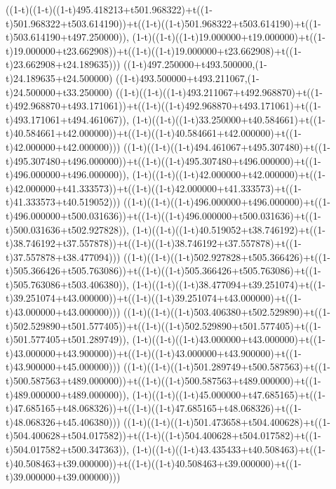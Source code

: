 ((1-t)((1-t)((1-t)495.418213+t501.968322)+t((1-t)501.968322+t503.614190))+t((1-t)((1-t)501.968322+t503.614190)+t((1-t)503.614190+t497.250000)),                                     (1-t)((1-t)((1-t)19.000000+t19.000000)+t((1-t)19.000000+t23.662908))+t((1-t)((1-t)19.000000+t23.662908)+t((1-t)23.662908+t24.189635)))
((1-t)497.250000+t493.500000,(1-t)24.189635+t24.500000)
((1-t)493.500000+t493.211067,(1-t)24.500000+t33.250000)
((1-t)((1-t)((1-t)493.211067+t492.968870)+t((1-t)492.968870+t493.171061))+t((1-t)((1-t)492.968870+t493.171061)+t((1-t)493.171061+t494.461067)),                                     (1-t)((1-t)((1-t)33.250000+t40.584661)+t((1-t)40.584661+t42.000000))+t((1-t)((1-t)40.584661+t42.000000)+t((1-t)42.000000+t42.000000)))
((1-t)((1-t)((1-t)494.461067+t495.307480)+t((1-t)495.307480+t496.000000))+t((1-t)((1-t)495.307480+t496.000000)+t((1-t)496.000000+t496.000000)),                                     (1-t)((1-t)((1-t)42.000000+t42.000000)+t((1-t)42.000000+t41.333573))+t((1-t)((1-t)42.000000+t41.333573)+t((1-t)41.333573+t40.519052)))
((1-t)((1-t)((1-t)496.000000+t496.000000)+t((1-t)496.000000+t500.031636))+t((1-t)((1-t)496.000000+t500.031636)+t((1-t)500.031636+t502.927828)),                                     (1-t)((1-t)((1-t)40.519052+t38.746192)+t((1-t)38.746192+t37.557878))+t((1-t)((1-t)38.746192+t37.557878)+t((1-t)37.557878+t38.477094)))
((1-t)((1-t)((1-t)502.927828+t505.366426)+t((1-t)505.366426+t505.763086))+t((1-t)((1-t)505.366426+t505.763086)+t((1-t)505.763086+t503.406380)),                                     (1-t)((1-t)((1-t)38.477094+t39.251074)+t((1-t)39.251074+t43.000000))+t((1-t)((1-t)39.251074+t43.000000)+t((1-t)43.000000+t43.000000)))
((1-t)((1-t)((1-t)503.406380+t502.529890)+t((1-t)502.529890+t501.577405))+t((1-t)((1-t)502.529890+t501.577405)+t((1-t)501.577405+t501.289749)),                                     (1-t)((1-t)((1-t)43.000000+t43.000000)+t((1-t)43.000000+t43.900000))+t((1-t)((1-t)43.000000+t43.900000)+t((1-t)43.900000+t45.000000)))
((1-t)((1-t)((1-t)501.289749+t500.587563)+t((1-t)500.587563+t489.000000))+t((1-t)((1-t)500.587563+t489.000000)+t((1-t)489.000000+t489.000000)),                                     (1-t)((1-t)((1-t)45.000000+t47.685165)+t((1-t)47.685165+t48.068326))+t((1-t)((1-t)47.685165+t48.068326)+t((1-t)48.068326+t45.406380)))
((1-t)((1-t)((1-t)501.473658+t504.400628)+t((1-t)504.400628+t504.017582))+t((1-t)((1-t)504.400628+t504.017582)+t((1-t)504.017582+t500.347363)),                                     (1-t)((1-t)((1-t)43.435433+t40.508463)+t((1-t)40.508463+t39.000000))+t((1-t)((1-t)40.508463+t39.000000)+t((1-t)39.000000+t39.000000)))
